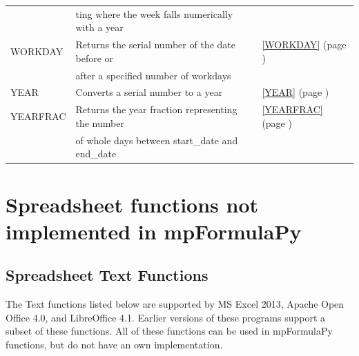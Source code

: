 \begin{center}
\begin{longtable}{l l l }
		& ting where the week falls numerically with a year &   \\
		WORKDAY & Returns the serial number of the date before or   &  \ref{WORKDAY} (page \pageref{WORKDAY}) \index{Spreadsheet Functions!WORKDAY} \\
		& after a specified number of workdays & \\
		YEAR  & Converts a serial number to a year &  \ref{YEAR} (page \pageref{YEAR}) \index{Spreadsheet Functions!YEAR} \\
		YEARFRAC & Returns the year fraction representing the number  &  \ref{YEARFRAC} (page \pageref{YEARFRAC}) \index{Spreadsheet Functions!YEARFRAC} \\
		& of whole days between start\_date and end\_date &   \\
	\end{longtable}
\end{center}





\newpage 
\section{Spreadsheet functions not implemented in mpFormulaPy}
\subsection{Spreadsheet Text Functions}
The Text functions listed below are supported by MS Excel 2013, Apache Open Office 4.0, and LibreOffice 4.1. Earlier versions of these programs support a subset of these functions.
All of these functions can be used in mpFormulaPy functions, but do not have an own implementation. 




